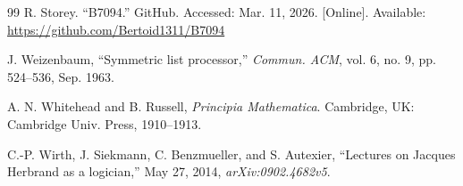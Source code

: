 \documentclass[journal]{IEEEtran}
\begin{document}
\begin{thebibliography}{99}
 R. Storey. ``B7094.''
  GitHub.
  Accessed: Mar. 11, 2026.  [Online].
  Available: \url{https://github.com/Bertoid1311/B7094}

 J. Weizenbaum, ``Symmetric list processor,''
  \textit{Commun. ACM}, vol. 6, no. 9, pp. 524--536, Sep. 1963.

 A. N. Whitehead and B. Russell,
  \textit{Principia Mathematica}. Cambridge, UK: Cambridge
  Univ. Press, 1910--1913.

 C.-P. Wirth, J. Siekmann,
  C. Benzmueller, and S. Autexier,
  ``Lectures on Jacques Herbrand as a logician,''
  May 27, 2014, \textit{arXiv:0902.4682v5}.

\end{thebibliography}

%
% 
\end{document}
